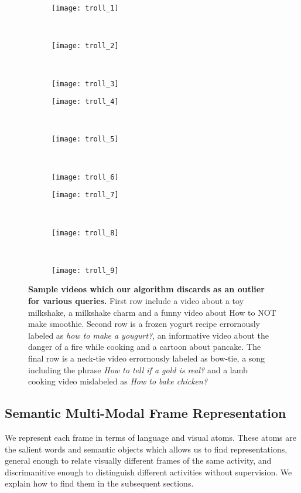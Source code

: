 \begin{figure}[ht]
  \begin{subfigure}[b]{0.16\textwidth}
    \texttt{[image: troll\_1]}
  \end{subfigure}~
  \begin{subfigure}[b]{0.16\textwidth}
    \texttt{[image: troll\_2]}
  \end{subfigure}~
  \begin{subfigure}[b]{0.16\textwidth}
    \texttt{[image: troll\_3]}
    \end{subfigure}

    \begin{subfigure}[b]{0.16\textwidth}
      \texttt{[image: troll\_4]}
    \end{subfigure}~
    \begin{subfigure}[b]{0.16\textwidth}
      \texttt{[image: troll\_5]}
    \end{subfigure}~
    \begin{subfigure}[b]{0.16\textwidth}
      \texttt{[image: troll\_6]}
  \end{subfigure}

  \begin{subfigure}[b]{0.16\textwidth}
    \texttt{[image: troll\_7]}
  \end{subfigure}~
  \begin{subfigure}[b]{0.16\textwidth}
    \texttt{[image: troll\_8]}
  \end{subfigure}~
  \begin{subfigure}[b]{0.16\textwidth}
    \texttt{[image: troll\_9]}
\end{subfigure}

\caption{\textbf{Sample videos which our algorithm discards as an outlier for various queries.}
First row include a video about a toy milkshake, a milkshake charm and a funny video about How to NOT make smoothie. Second row is a frozen yogurt recipe errornously labeled as \emph{how to make a yougurt?}, an informative video about the danger of a fire while cooking and a cartoon about pancake. The final row is a neck-tie video errornously labeled as bow-tie, a song including the phrase \emph{How to tell if a gold is real?} and a lamb cooking video mislabeled as \emph{How to bake chicken?}}
\label{outliers}
\end{figure}

\subsection{Semantic Multi-Modal Frame Representation}
We represent each frame in terms of language and visual atoms. These atoms are the salient words and semantic objects which allows us to find representations, general enough to relate visually different frames of the same activity, and discrimanitive enough to distinguish different activities without supervision. We explain how to find them in the subsequent sections.

